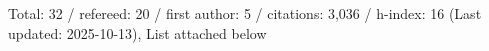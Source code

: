 Total: 32 / refereed: 20 / first author: 5 / citations: 3,036 / h-index: 16 (Last updated: 2025-10-13), List attached below